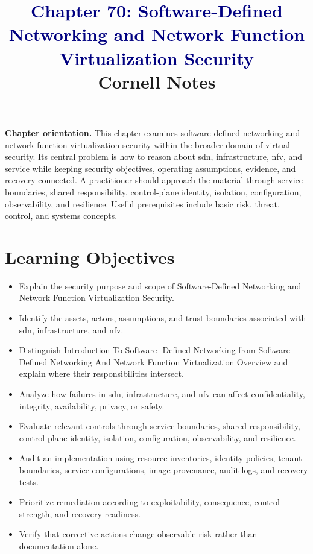 \documentclass[11pt]{article}
\title{\textcolor{Navy}{Chapter 70: Software-Defined Networking and Network Function Virtualization Security}\\[2mm]\large Cornell Notes}
\author{}
\date{}
\begin{document}
\maketitle
\thispagestyle{fancy}
\vspace{-1.5em}
\begin{orientationbox}
\textbf{Chapter orientation.} This chapter examines software-defined networking and network function virtualization security within the broader domain of virtual security. Its central problem is how to reason about sdn, infrastructure, nfv, and service while keeping security objectives, operating assumptions, evidence, and recovery connected. A practitioner should approach the material through service boundaries, shared responsibility, control-plane identity, isolation, configuration, observability, and resilience. Useful prerequisites include basic risk, threat, control, and systems concepts.
\end{orientationbox}
\section*{Learning Objectives}
\begin{itemize}
\item Explain the security purpose and scope of Software-Defined Networking and Network Function Virtualization Security.
\item Identify the assets, actors, assumptions, and trust boundaries associated with sdn, infrastructure, and nfv.
\item Distinguish Introduction To Software- Defined Networking from Software-Defined Networking And Network Function Virtualization Overview and explain where their responsibilities intersect.
\item Analyze how failures in sdn, infrastructure, and nfv can affect confidentiality, integrity, availability, privacy, or safety.
\item Evaluate relevant controls through service boundaries, shared responsibility, control-plane identity, isolation, configuration, observability, and resilience.
\item Audit an implementation using resource inventories, identity policies, tenant boundaries, service configurations, image provenance, audit logs, and recovery tests.
\item Prioritize remediation according to exploitability, consequence, control strength, and recovery readiness.
\item Verify that corrective actions change observable risk rather than documentation alone.
\end{itemize}
\end{document}
